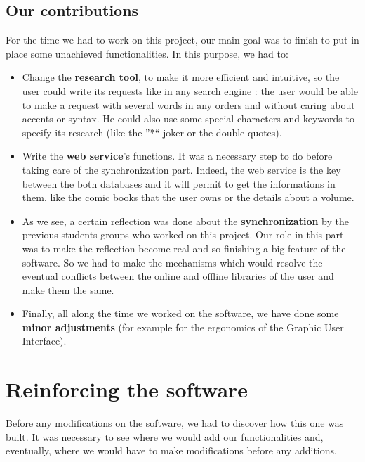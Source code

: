 \documentclass[11pt]{report} %
\newcommand{\txtimp}[1]{\textbf{#1}}
\begin{document}
\section{Our contributions}
For the time we had to work on this project, our main goal was to finish to put in place some unachieved functionalities. In this purpose, we had to:
\begin{itemize}
\item Change the \txtimp{research tool}, to make it more efficient and intuitive, so the user could write its requests like in any search engine : the user would be able to make a request with several words in any orders and without caring about accents or syntax. He could also use some special characters and keywords to specify its research (like the ''*`` joker or the double quotes).
\item Write the \txtimp{web service}'s functions. It was a necessary step to do before taking care of the synchronization part. Indeed, the web service is the key between the both databases and it will permit to get the informations in them, like the comic books that the user owns or the details about a volume.
\item As we see, a certain reflection was done about the \txtimp{synchronization} by the previous students groups who worked on this project. Our role in this part was to make the reflection become real and so finishing a big feature of the software. So we had to make the mechanisms which would resolve the eventual conflicts between the online and offline libraries of the user and make them the same.
\item Finally, all along the time we worked on the software, we have done some \txtimp{minor adjustments} (for example for the ergonomics of the Graphic User Interface).

\end{itemize}


%
% 

\chapter{Reinforcing the software}
Before any modifications on the software, we had to discover how this one was built. It was necessary to see where we would add our functionalities and, eventually, where we would have to make modifications before any additions.
\end{document}
